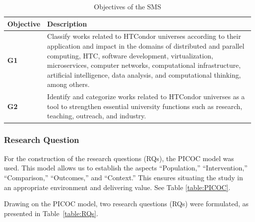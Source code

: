 \begin{table}[htbp]
	\centering
	\caption{Objectives of the SMS}
	\label{table:Goals}
	\renewcommand{\arraystretch}{1}  %
	\begin{tabular}{p{1cm}p{6.8cm}}
		\toprule
		\textbf{Objective} & \textbf{Description}                                                                                                                                                                                                                                                                                                                      \\
		\midrule
		\textbf{G1}        & Classify works related to HTCondor universes according to their application and impact in the domains of distributed and parallel computing, HTC, software development, virtualization, microservices, computer networks, computational infrastructure, artificial intelligence, data analysis, and computational thinking, among others. \\
		\addlinespace[0.8em]
		\textbf{G2}        & Identify and categorize works related to HTCondor universes as a tool to strengthen essential university functions such as research, teaching, outreach, and industry.                                                                                                                                                                    \\
		\bottomrule
	\end{tabular}
\end{table}

\subsubsection{Research Question}
For the construction of the research questions (RQs), the PICOC model \cite{Needleman20026, Petticrew2008systematic} was used. This model allows us to establish the aspects ``Population,'' ``Intervention,'' ``Comparison,'' ``Outcomes,'' and ``Context.'' This ensures situating the study in an appropriate environment and delivering value. See Table \ref{table:PICOC}.

Drawing on the PICOC model, two research questions (RQs) were formulated, as presented in Table~\ref{table:RQs}.

